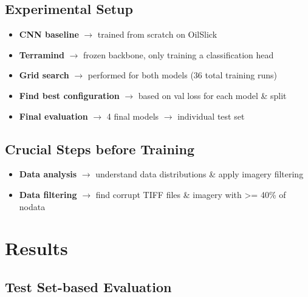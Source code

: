 \documentclass[a0, landscape, final]{./unirostock/a0poster}
\begin{document}
\subsection{Experimental Setup} \vspace{-1.5em}
\begin{itemize}
  \item \textbf{CNN baseline} $\to$ trained from scratch on OilSlick
  \item \textbf{Terramind} \cite{11445875} $\to$ frozen backbone, only training a classification head
  \item \textbf{Grid search} $\to$ performed for both models (36 total training runs)
  \item \textbf{Find best configuration} $\to$ based on val loss for each model \& split
  \item \textbf{Final evaluation} $\to$ 4 final models $\to$ individual test set
\end{itemize}
\vspace{.85em}
\subsection{Crucial Steps before Training} \vspace{-1.5em}
\begin{itemize}
  \item \textbf{Data analysis} $\to$ understand data distributions \& apply imagery filtering
  \item \textbf{Data filtering} $\to$ find corrupt TIFF files \& imagery with >= 40\% of nodata
\end{itemize}


\columnbreak
\section{Results}

\vspace{.5em}
\subsection{Test Set-based Evaluation}
\end{document}
